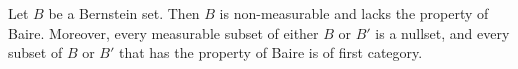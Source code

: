 Let $B$ be a Bernstein set. Then $B$ is non-measurable and lacks the property of Baire. Moreover, every measurable subset of either $B$ or $B'$ is a nullset, and every subset of $B$ or $B'$ that has the property of Baire is of first category.